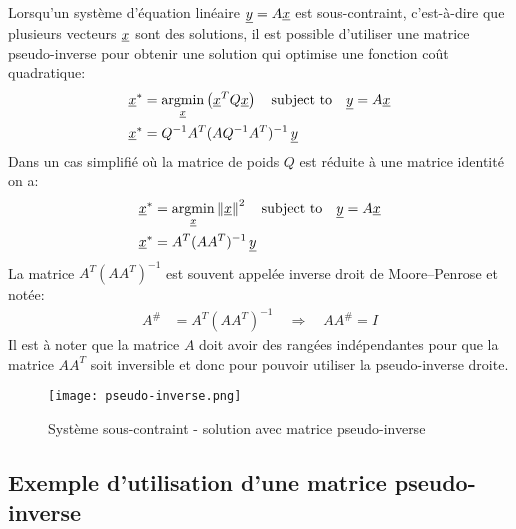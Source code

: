 Lorsqu'un système d'équation linéaire $\underline{y} = A \underline{x}$ est sous-contraint, c'est-à-dire que plusieurs vecteurs $\underline{x}$ sont des solutions, il est possible d'utiliser une matrice pseudo-inverse pour obtenir une solution qui optimise une fonction coût quadratique:
\begin{align}
	\col{x}^* &= \operatornamewithlimits{argmin}\limits_{\col{x}} \left( \col{x}^T Q \col{x} \right) \quad \text{subject to} \quad \col{y} = A \col{x}  \\
	\col{x}^* &= Q^{-1} A^T (A Q^{-1} A^T)^{-1} \, \col{y}
\end{align}
Dans un cas simplifié où la matrice de poids $Q$ est réduite à une matrice identité on a:
\begin{align}
	\col{x}^* &= \operatornamewithlimits{argmin}\limits_{\col{x}} \left\| \col{x} \right\|^2 \quad \text{subject to} \quad \col{y} = A \col{x}  \\
	\col{x}^* &= A^T (A A^T)^{-1} \, \col{y}
\end{align}
La matrice $A^T (A A^T)^{-1}$ est souvent appelée inverse droit de Moore–Penrose et notée:
\begin{align}
	A^{\#} &= A^T (A A^T)^{-1}  \quad \Rightarrow \quad A A^{\#} = I
\end{align}
Il est à noter que la matrice $A$ doit avoir des rangées indépendantes pour que la matrice $A A^T$ soit inversible et donc pour pouvoir utiliser la pseudo-inverse droite.

\begin{figure}[htbp]
	\centering
	\texttt{[image: pseudo-inverse.png]}
	\caption{Système sous-contraint - solution avec matrice pseudo-inverse}
	\label{fig:pseudo-inverse}
\end{figure}




\newpage
\subsection{Exemple d'utilisation d'une matrice pseudo-inverse}

